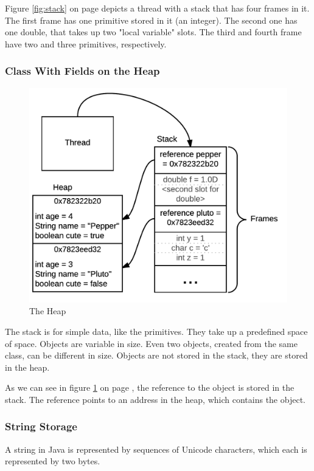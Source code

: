 Figure \ref{fig:stack} on page \pageref{fig:stack} depicts a thread with a stack that has four frames in it. The first frame has one primitive stored in it (an integer). The second one has one double, that takes up two "local variable" slots. The third and fourth frame have two and three primitives, respectively.

\subsubsection{Class With Fields on the Heap}
\begin{figure}[!h]\centering
\includegraphics[width=0.9\linewidth, frame]{images/heap}
\caption{The Heap}
\label{fig:heap}
\end{figure}
The stack is for simple data, like the primitives. They take up a predefined space of space. Objects are variable in size. Even two objects, created from the same class, can be different in size. Objects are not stored in the stack, they are stored in the heap. 

As we can see in figure \ref{fig:heap} on page \pageref{fig:heap}, the reference to the object is stored in the stack. The reference points to an address in the heap, which contains the object.\cite{gosling}

\subsubsection{String Storage} A string in Java is represented by sequences of Unicode characters, which each is represented by two bytes. 

